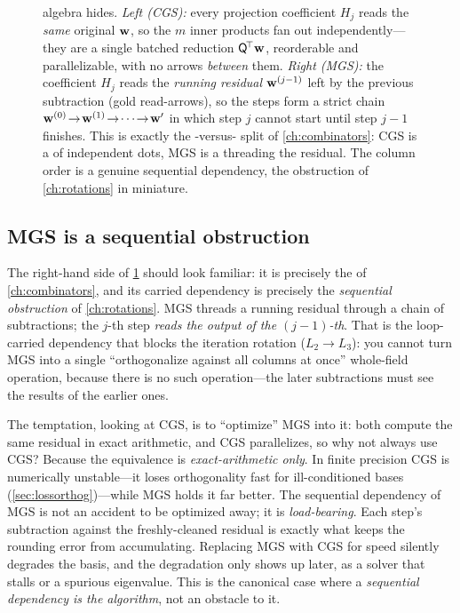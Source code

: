 \begin{figure}[t]
{algebra hides. \emph{Left (CGS):} every projection coefficient $H_j$ reads the
\emph{same} original $\mathbf{w}$, so the $m$ inner products fan out independently---they
are a single batched reduction $\mathsf{Q}^{\!\top}\mathbf{w}$, reorderable and parallelizable,
with no arrows \emph{between} them. \emph{Right (MGS):} the coefficient $H_j$ reads
the \emph{running residual} $\mathbf{w}^{(j-1)}$ left by the previous subtraction (gold
read-arrows), so the steps form a strict chain $\mathbf{w}^{(0)}\!\to\!\mathbf{w}^{(1)}\!\to\!
\cdots\!\to\!\mathbf{w}'$ in which step $j$ cannot start until step $j-1$ finishes. This is
exactly the -versus- split of \cref{ch:combinators}: CGS is a
 of independent dots, MGS is a  threading the residual. The
column order is a genuine sequential dependency, the obstruction of
\cref{ch:rotations} in miniature.}
\label{fig:cgsmgs}
\end{figure}

\subsection{MGS is a sequential obstruction}

The right-hand side of \cref{fig:cgsmgs} should look familiar: it is precisely the
 of \cref{ch:combinators}, and its carried dependency is precisely the
\emph{sequential obstruction} of \cref{ch:rotations}. MGS threads a running residual
through a chain of subtractions; the $j$-th step \emph{reads the output of the
$(j-1)$-th}. That is the loop-carried dependency that blocks the iteration rotation
($L_2 \to L_3$): you cannot turn MGS into a single ``orthogonalize against all
columns at once'' whole-field operation, because there is no such operation---the
later subtractions must see the results of the earlier ones.

\begin{pitfall}
The temptation, looking at CGS, is to ``optimize'' MGS into it: both compute the same
residual in exact arithmetic, and CGS parallelizes, so why not always use CGS? Because
the equivalence is \emph{exact-arithmetic only}. In finite precision CGS is
numerically unstable---it loses orthogonality fast for ill-conditioned bases
(\cref{sec:lossorthog})---while MGS holds it far better. The sequential dependency of
MGS is not an accident to be optimized away; it is \emph{load-bearing}. Each step's
subtraction against the freshly-cleaned residual is exactly what keeps the rounding
error from accumulating. Replacing MGS with CGS for speed silently degrades the
basis, and the degradation only shows up later, as a solver that stalls or a
spurious eigenvalue. This is the canonical case where a \emph{sequential dependency
is the algorithm}, not an obstacle to it.
\end{pitfall}

